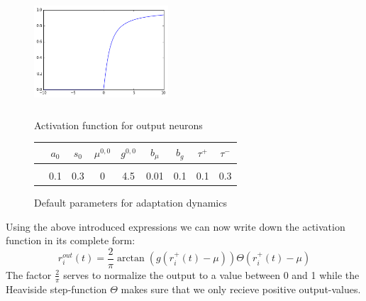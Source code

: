\documentclass[a4paper, 12pt]{article}
\begin{document}
\begin{figure}[h]
\setlength{\abovecaptionskip}{5pt}
\setlength{\belowcaptionskip}{0pt}	
	\begin{minipage}[t]{0.5\textwidth}\vspace{0pt}
	\includegraphics[width=5cm, height=4cm]{pics/output_function.png}
	\caption{\footnotesize{Activation function for output neurons}}
	\end{minipage}
\hfill
	\begin{minipage}[t]{0.5\textwidth}\vspace{20pt}
	\begin{tabular}{c|cccccccc}
	& $a_0$ & $s_0$ & $\mu^{0,0}$ & $g^{0,0}$ & $b_\mu$ & $b_g$& $\tau^+$ & $\tau^-$\\
	\hline\\
	& 0.1 & 0.3 & 0 & 4.5 & 0.01 & 0.1& 0.1 & 0.3\\
	\end{tabular}
	\caption{\footnotesize{Default parameters for adaptation dynamics}}
	\end{minipage}
\end{figure}	

\noindent Using the above introduced expressions we can now write down the activation function in its complete form: 
	\begin{equation}
	r_i^{out}(t)=\frac{2}{\pi}\arctan(g(r_i^+(t)-\mu))\Theta( r_i^+(t)-\mu)
	\end{equation}
The factor $\frac{2}{\pi}$ serves to normalize the output to a value between 0 and 1 while the Heaviside step-function $\Theta$ makes sure that we only recieve positive output-values. 
%
%
%
\end{document}
